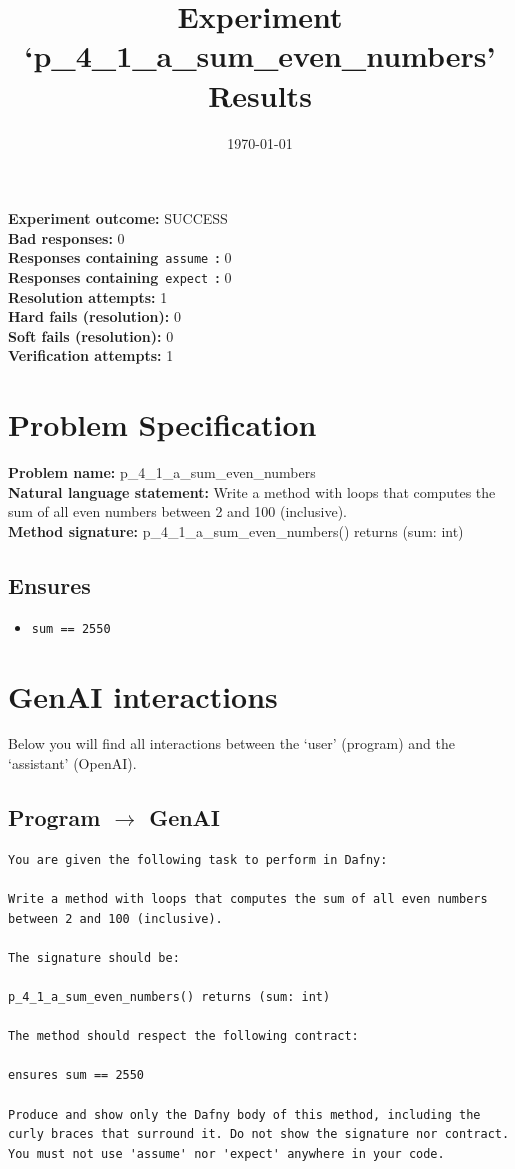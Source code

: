 \documentclass{article}
\begin{document}
\title{Experiment `p\_4\_1\_a\_sum\_even\_numbers' Results}
\author{\today}
\date{}
\maketitle
\textbf{Experiment outcome: }SUCCESS
\\\textbf{Bad responses: }0
\\\textbf{Responses containing}~\texttt{assume}~\textbf{: }0
\\\textbf{Responses containing}~\texttt{expect}~\textbf{: }0
\\\textbf{Resolution attempts: }1
\\\textbf{Hard fails (resolution): }0
\\\textbf{Soft fails (resolution): }0
\\\textbf{Verification attempts: }1
\section*{Problem Specification}
\textbf{Problem name: }p\_4\_1\_a\_sum\_even\_numbers
\\\textbf{Natural language statement: }Write a method with loops that computes the sum of all even numbers between 2 and 100 (inclusive).
\\\textbf{Method signature: }p\_4\_1\_a\_sum\_even\_numbers() returns (sum: int)
\subsection*{Ensures}
\begin{itemize}
\item \texttt{sum == 2550}
\end{itemize}
\clearpage
\section*{GenAI interactions}
Below you will find all interactions between the `user' (program) and the `assistant' (OpenAI).
\subsection*{Program $\rightarrow$ GenAI}
\begin{lstlisting}
You are given the following task to perform in Dafny:

Write a method with loops that computes the sum of all even numbers between 2 and 100 (inclusive).

The signature should be:

p_4_1_a_sum_even_numbers() returns (sum: int)

The method should respect the following contract:

ensures sum == 2550

Produce and show only the Dafny body of this method, including the curly braces that surround it. Do not show the signature nor contract. You must not use 'assume' nor 'expect' anywhere in your code.
\end{lstlisting}
\end{document}
